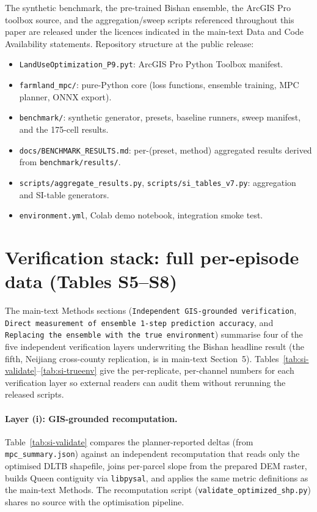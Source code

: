 \documentclass[11pt]{article}
\begin{document}
The synthetic benchmark, the pre-trained Bishan ensemble, the ArcGIS Pro toolbox source, and the aggregation/sweep scripts referenced throughout this paper are released under the licences indicated in the main-text Data and Code Availability statements. Repository structure at the public release:

\begin{itemize}
\item \texttt{LandUseOptimization\_P9.pyt}: ArcGIS Pro Python Toolbox manifest.
\item \texttt{farmland\_mpc/}: pure-Python core (loss functions, ensemble training, MPC planner, ONNX export).
\item \texttt{benchmark/}: synthetic generator, presets, baseline runners, sweep manifest, and the 175-cell results.
\item \texttt{docs/BENCHMARK\_RESULTS.md}: per-(preset, method) aggregated results derived from \texttt{benchmark/results/}.
\item \texttt{scripts/aggregate\_results.py}, \texttt{scripts/si\_tables\_v7.py}: aggregation and SI-table generators.
\item \texttt{environment.yml}, Colab demo notebook, integration smoke test.
\end{itemize}

\section{Verification stack: full per-episode data (Tables S5--S8)}\label{si:s5-verification}

The main-text Methods sections (\texttt{Independent GIS-grounded verification}, \texttt{Direct measurement of ensemble 1-step prediction accuracy}, and \texttt{Replacing the ensemble with the true environment}) summarise four of the five independent verification layers underwriting the Bishan headline result (the fifth, Neijiang cross-county replication, is in main-text Section~5). Tables~\ref{tab:si-validate}--\ref{tab:si-trueenv} give the per-replicate, per-channel numbers for each verification layer so external readers can audit them without rerunning the released scripts.

\paragraph{Layer (i): GIS-grounded recomputation.} Table~\ref{tab:si-validate} compares the planner-reported deltas (from \texttt{mpc\_summary.json}) against an independent recomputation that reads only the optimised DLTB shapefile, joins per-parcel slope from the prepared DEM raster, builds Queen contiguity via \texttt{libpysal}, and applies the same metric definitions as the main-text Methods. The recomputation script (\texttt{validate\_optimized\_shp.py}) shares no source with the optimisation pipeline.
\end{document}
